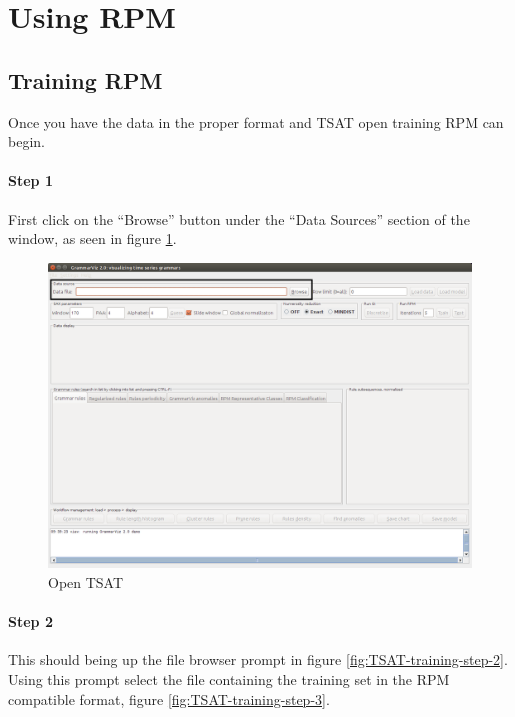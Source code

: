 \documentclass[letterpaper, 12pt]{article}
\begin{document}
\section{Using RPM}

\subsection{Training RPM}
Once you have the data in the proper format and TSAT open training RPM can begin.

\paragraph{Step 1}
First click on the ``Browse'' button under the ``Data Sources'' section of the window, as seen in figure \ref{fig:TSAT-training-step-1}. 

\begin{figure}[h]
  \includegraphics[width=\textwidth]{TSAT-training-step-1}
  \caption{Open TSAT}
  \label{fig:TSAT-training-step-1}
\end{figure}
\newpage
\paragraph{Step 2}
This should being up the file browser prompt in figure \ref{fig:TSAT-training-step-2}. Using this prompt select the file containing the training set in the RPM compatible format, figure \ref{fig:TSAT-training-step-3}.
\end{document}
